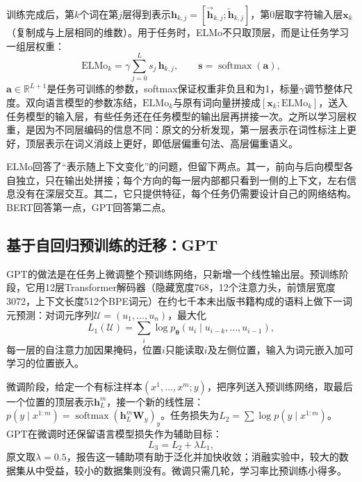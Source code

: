 训练完成后，第$k$个词在第$j$层得到表示$\bm h_{k,j}=[\overrightarrow{\bm h}_{k,j};\overleftarrow{\bm h}_{k,j}]$，第0层取字符输入层$\bm x_k$（复制成与上层相同的维数）。用于任务时，ELMo不只取顶层，而是让任务学习一组层权重：
\begin{equation}
  \mathrm{ELMo}_k=\gamma\sum_{j=0}^{L}s_j\,\bm h_{k,j},\qquad \bm s=\operatorname{softmax}(\bm a),
  \label{eq:nlp-classical-elmo}
\end{equation}
$\bm a\in\mathbb R^{L+1}$是任务可训练的参数，softmax保证权重非负且和为1，标量$\gamma$调节整体尺度。双向语言模型的参数冻结，$\mathrm{ELMo}_k$与原有词向量拼接成$[\bm x_k;\mathrm{ELMo}_k]$，送入任务模型的输入层，有些任务还在任务模型的输出层再拼接一次。之所以学习层权重，是因为不同层编码的信息不同：原文的分析发现，第一层表示在词性标注上更好，顶层表示在词义消歧上更好，即低层偏重句法、高层偏重语义。

ELMo回答了“表示随上下文变化”的问题，但留下两点。其一，前向与后向模型各自独立，只在输出处拼接；每个方向的每一层内部都只看到一侧的上下文，左右信息没有在深层交互。其二，它只提供特征，每个任务仍需要设计自己的网络结构。BERT回答第一点，GPT回答第二点。

\subsection{基于自回归预训练的迁移：GPT}
\label{sec:nlp-classical-gpt}

GPT的做法是在任务上微调整个预训练网络，只新增一个线性输出层。预训练阶段，它用12层Transformer解码器（隐藏宽度768，12个注意力头，前馈层宽度3072，上下文长度512个BPE词元）在约七千本未出版书籍构成的语料上做下一词元预测：对词元序列$\mathcal U=(u_1,\ldots,u_n)$，最大化
\[
  L_1(\mathcal U)=\sum_i\log p_{\bm\theta}(u_i\mid u_{i-k},\ldots,u_{i-1}),
\]
每一层的自注意力加因果掩码，位置$i$只能读取$i$及左侧位置，输入为词元嵌入加可学习的位置嵌入。

微调阶段，给定一个有标注样本$(x^1,\ldots,x^m;y)$，把序列送入预训练网络，取最后一个位置的顶层表示$\bm h^{m}_{L}$，接一个新的线性层：$p(y\mid x^{1:m})=\operatorname{softmax}(\bm h^{m}_{L}\bm W_y)_y$。任务损失为$L_2=\sum\log p(y\mid x^{1:m})$。GPT在微调时还保留语言模型损失作为辅助目标：
\begin{equation}
  L_3=L_2+\lambda L_1,
  \label{eq:nlp-classical-gpt-finetune}
\end{equation}
原文取$\lambda=0.5$，报告这一辅助项有助于泛化并加快收敛；消融实验中，较大的数据集从中受益，较小的数据集则没有。微调只需几轮，学习率比预训练小得多。

